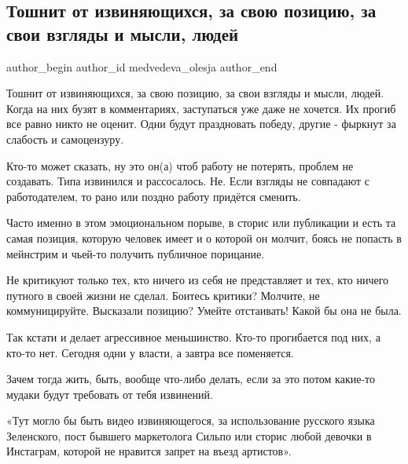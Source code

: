  
 
 
 
 
 
\subsection{Тошнит от извиняющихся, за свою позицию, за свои взгляды и мысли, людей}
\label{sec:28_06_2021.fb.medvedeva_olesja.1.ludi}
\ifcmt
 author_begin
   author_id medvedeva_olesja
 author_end
\fi

Тошнит от извиняющихся, за свою позицию, за свои взгляды и мысли, людей. Когда
на них бузят в комментариях, заступаться уже даже не хочется. Их прогиб все
равно никто не оценит. Одни будут праздновать победу, другие - фыркнут за
слабость и самоцензуру. 

Кто-то может сказать, ну это он(а) чтоб работу не потерять, проблем не
создавать. Типа извинился и рассосалось. Не. Если взгляды не совпадают с
работодателем, то рано или поздно работу придётся сменить.

Часто именно в этом эмоциональном порыве,  в сторис или публикации и есть та
самая позиция, которую человек имеет и о которой он молчит, боясь не попасть в
мейнстрим и чьей-то получить публичное порицание.

Не критикуют только тех, кто ничего из себя не представляет и тех, кто ничего
путного в своей жизни не сделал. Боитесь критики? Молчите, не коммуницируйте.
Высказали позицию? Умейте отстаивать! Какой бы она не была.

Так кстати и делает агрессивное меньшинство. Кто-то прогибается под них, а
кто-то нет. Сегодня одни у власти, а завтра все поменяется.

Зачем тогда жить, быть, вообще что-либо делать, если за это потом какие-то
мудаки будут требовать от тебя извинений. 

«Тут могло бы быть видео извиняющегося, за использование русского языка
Зеленского, пост бывшего маркетолога Сильпо или сторис любой девочки в
Инстаграм, которой не нравится запрет на въезд артистов».

